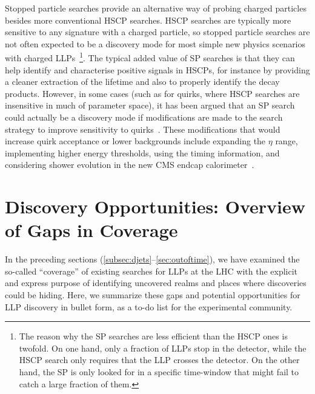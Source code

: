 Stopped particle searches provide an alternative way of probing charged particles besides more conventional HSCP searches. HSCP searches are typically more sensitive to any signature with a charged particle, so stopped particle searches are not often expected to be a discovery mode for most simple new physics scenarios with charged LLPs~\footnote{The reason why the SP searches are less efficient than the HSCP ones is twofold. On one hand, only a fraction of LLPs stop in the detector, while the HSCP search only requires that the LLP crosses the detector. On the other hand, the SP is only looked for in a specific time-window that might fail to catch a large fraction of them.}. The typical added value of SP searches is that they can help identify and characterise positive signals in HSCPs, for instance by providing a cleaner extraction of the lifetime and also to properly identify the decay products. However, in some cases (such as for quirks, where HSCP searches are insensitive in much of parameter space), it has been argued that an SP search could actually be a discovery mode if modifications are made to the search strategy to improve sensitivity to quirks~\cite{Evans:2018jmd}.  These modifications that would increase quirk acceptance or lower backgrounds include expanding the $\eta$ range, implementing higher energy thresholds, using the timing information, and considering shower evolution in the new CMS endcap calorimeter~\cite{Collaboration:2293646}.

\section{Discovery Opportunities: Overview of Gaps in Coverage}
\label{sec:covgaps}

In the preceding sections (\ref{subsec:djets}--\ref{sec:outoftime}), we have examined the so-called ``coverage'' of existing searches for LLPs at the LHC with the explicit and express purpose of identifying uncovered realms and places where discoveries could be hiding. Here, we summarize these gaps and potential opportunities for LLP discovery in bullet form, as a to-do list for the experimental community.

